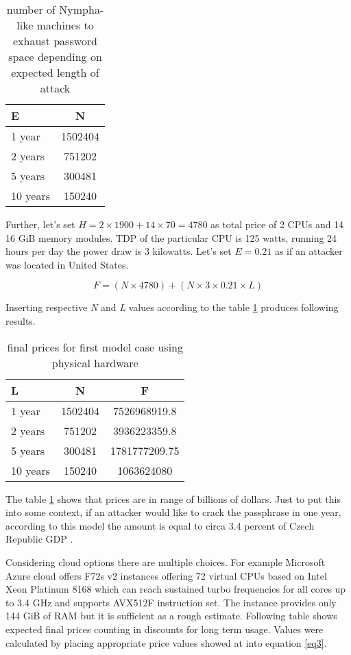 \documentclass[nolof]{fithesis3}
\begin{document}
\noindent
\begin{table}
\caption{number of Nympha-like machines to exhaust password space depending on expected length of attack}
\label{tab:at1}
\begin{tabularx}{\textwidth}{| l | c |}
\hline
E & N\\
\hline
1 year & 1502404\\
\hline
2 years & 751202\\
\hline
5 years & 300481\\
\hline
10 years & 150240\\
\hline
\end{tabularx}
\end{table}

Further, let's set $H = 2 \times 1900 + 14 \times 70 = 4780$ as total price of 2 CPUs and 14 16 GiB memory modules. TDP of the particular CPU is 125 watts, running 24 hours per day the power draw is 3 kilowatts. Let's set $E = 0.21$ as if an attacker was located in United States.

$$F = ( N \times 4780 ) + ( N \times 3 \times 0.21 \times L)$$

Inserting respective \emph{N} and \emph{L} values according to the table \ref{tab:at1} produces following results.

\noindent
\begin{table}
\caption{final prices for first model case using physical hardware}
\label{tab:at2}
\begin{tabularx}{\textwidth}{| l | c | c |}
\hline
L & N & F\\
\hline
1 year & 1502404 & 7526968919.8\\
\hline
2 years & 751202 & 3936223359.8\\
\hline
5 years & 300481 & 1781777209.75\\
\hline
10 years & 150240 & 1063624080\\
\hline
\end{tabularx}
\end{table}

The table \ref{tab:at1} shows that prices are in range of billions of dollars. Just to put this into some context, if an attacker would like to crack the passphrase in one year, according to this model the amount is equal to circa 3.4 percent of Czech Republic GDP \parencite{czechgdp}.

Considering cloud options there are multiple choices. For example Microsoft Azure cloud offers F72s v2 instances offering 72 virtual CPUs based on Intel Xeon Platinum 8168 which can reach sustained turbo frequencies for all cores up to 3.4 GHz and supports AVX512F instruction set. The instance provides only 144 GiB of RAM but it is sufficient as a rough estimate. Following table shows expected final prices counting in discounts for long term usage. Values were calculated by placing appropriate price values showed at \parencite{azure} into equation \ref{eq3}.
\end{document}
